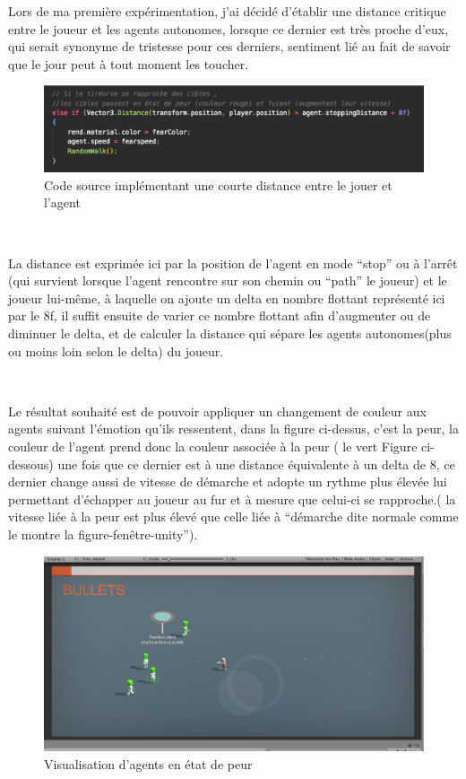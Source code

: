 Lors de ma première expérimentation, j’ai décidé d’établir une distance critique entre le joueur et les agents autonomes, lorsque ce dernier est très proche d’eux, qui serait synonyme de tristesse pour ces derniers, sentiment lié au fait de savoir que le jour peut à tout moment les toucher.


\begin{figure}[th]
\centering
\includegraphics{Figures/fonctdist.JPG}
\decoRule
\caption[Code source implémentant une courte distance ]{Code source implémentant une courte distance entre le jouer et l'agent}
\label{fig:751}
\end{figure}



~\par
La distance est exprimée ici par la position de l’agent en mode “stop” ou à l'arrêt (qui survient lorsque l’agent rencontre sur son chemin ou “path” le joueur) et le joueur lui-même, à laquelle on ajoute un delta en nombre flottant représenté ici par le 8f, il suffit ensuite de varier ce nombre flottant afin d’augmenter ou de diminuer le delta, et de calculer la distance qui sépare les agents autonomes(plus ou moins loin selon le delta) du joueur. 

~\par
Le résultat souhaité est de pouvoir appliquer un changement de couleur aux agents suivant l’émotion qu’ils ressentent, dans la figure ci-dessus, c’est la peur, la couleur de l’agent prend donc la couleur associée à la peur ( le vert Figure ci-dessous) une fois que ce dernier est à une distance équivalente à un delta de 8, ce dernier change aussi de vitesse de démarche et adopte un rythme plus élevée lui permettant d'échapper au joueur au fur et à mesure que celui-ci se rapproche.( la vitesse liée à la peur est plus élevé que celle liée à “démarche dite normale comme le montre la figure-fenêtre-unity”).


\begin{figure}[th]
\centering
\includegraphics{Figures/bichi1.JPG}
\decoRule
\caption[Visualisation d'agents en état de peur]{Visualisation d'agents en état de peur}
\label{fig:bichi}
\end{figure}



